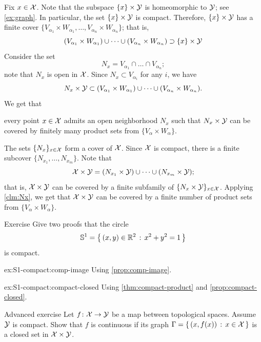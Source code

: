 Fix $x \in \mathcal{X}$.
Note that the subspace $\{x\}\times \mathcal{Y}$ is homeomorphic to $\mathcal{Y}$; see \ref{ex:graph}.
In particular, the set $\{x\}\times \mathcal{Y}$ is compact.
Therefore, $\{x\}\times \mathcal{Y}$ has a finite cover $\{V_{\alpha_1}\times W_{\alpha_1},\ldots,V_{\alpha_n}\times W_{\alpha_n}\}$; that is,
\[(V_{\alpha_1}\times W_{\alpha_1})\cup\dots\cup
(V_{\alpha_n}\times W_{\alpha_n})
\supset \{x\}\times \mathcal{Y}\]
Consider the set
\[N_x=V_{\alpha_1}\cap\dots\cap V_{\alpha_n};\]
note that $N_x$ is open in $\mathcal{X}$.
Since $N_x\subset V_{\alpha_i}$ for any $i$, we have
\[N_x\times \mathcal{Y}\subset (V_{\alpha_1}\times W_{\alpha_1})\cup\dots\cup
(V_{\alpha_n}\times W_{\alpha_n}).\]
We get that
\begin{clm}{}\label{clm:Nx}
every point $x\in\mathcal{X}$ admits an open neighborhood $N_x$ such that $N_x\times \mathcal{Y}$ can be covered by finitely many product sets from $\{V_\alpha\times W_\alpha\}$.
\end{clm}


The sets $\{N_x\}_{x\in\mathcal{X}}$ form a cover of $\mathcal{X}$.
Since $\mathcal{X}$ is compact, 
there is a finite subcover $\{N_{x_1},\ldots,N_{x_m}\}$.
Note that 
\[\mathcal{X}\times\mathcal{Y}=(N_{x_1}\times \mathcal{Y})\cup\dots\cup (N_{x_m}\times \mathcal{Y});\]
that is, $\mathcal{X}\times\mathcal{Y}$ can be
covered by a finite subfamily of $\{N_x\times \mathcal{Y}\}_{x\in\mathcal{X}}$.
Applying \ref{clm:Nx}, we get that $\mathcal{X}\times\mathcal{Y}$ can be covered by a finite number of product sets from $\{V_\alpha\times W_\alpha\}$.
\qeds

\begin{thm}{Exercise}\label{ex:S1-compact}
Give two proofs that the circle
\[\mathbb{S}^1=\left\{\,{(x,y)\in\mathbb{R}^2}\,:\,{x^2+y^2=1}\,\right\}\]
is compact.

\begin{subthm}{ex:S1-compact:comp-image}
Using \ref{prop:comp-image}.
\end{subthm}


\begin{subthm}{ex:S1-compact:compact-closed}
Using \ref{thm:compact-product} and \ref{prop:compact-closed}.
\end{subthm}

\end{thm}

\begin{thm}{Advanced exercise}\label{ex:closed-graph}
Let $f\colon\mathcal{X}\to\mathcal{Y}$ be a map between topological spaces.
Assume $\mathcal{Y}$ is compact.
Show that $f$ is continuous if its graph $\Gamma=\left\{\,{(x,f(x))}\,:\,{x\in\mathcal{X}}\,\right\}$ is a closed set in $\mathcal{X}\times\mathcal{Y}$.
\end{thm}

